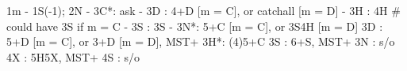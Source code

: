 1m - 1S(-1); 2N -
3C*: ask
   - 3D : 4+D [m = C], or catchall [m = D]
   - 3H : 4H  # could have 3S if m = C
   - 3S : 3S  
   - 3N*: 5+C [m = C], or 3S4H [m = D]
3D : 5+D [m = C], or 3+D [m = D], MST+
3H*: (4)5+C
3S : 6+S, MST+
3N : s/o
4X : 5H5X, MST+
4S : s/o
